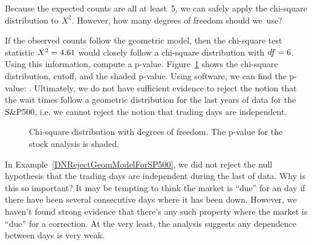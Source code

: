 \begin{exercisewrap}
\begin{nexercise}
Because the expected counts are all at least~5,
we can safely apply the chi-square distribution to $X^2$.
However, how many degrees of freedom should
we~use?\footnotemark{}
\end{nexercise}
\end{exercisewrap}

\begin{examplewrap}
\begin{nexample}{If the observed counts follow the
    geometric model, then the chi-square test statistic
    $X^2 = 4.61{}$ would closely follow a chi-square
    distribution with $df = 6{}$.
    Using this information, compute a p-value.} 
  \label{DNRejectGeomModelForSP500}%
  Figure~\ref{geomFitPValueForSP500} shows the
  chi-square distribution, cutoff, and the shaded p-value.
  Using software, we can find the p-value: \spdaysPvalue{}.
  Ultimately, we do not have sufficient evidence to reject
  the notion that the wait times follow a geometric
  distribution for the last \spyears{} years of data
  for the S\&P500,
  i.e. we cannot reject the notion that trading days
  are independent.
\end{nexample}
\end{examplewrap}

\begin{figure}[h]
  \centering
  \caption{Chi-square distribution with \spdaysDF{}
      degrees of freedom.
      The p-value for the stock analysis is shaded.}
  \label{geomFitPValueForSP500}
\end{figure}

\begin{examplewrap}
\begin{nexample}{In
    Example~\ref{DNRejectGeomModelForSP500},
    we did not reject the null hypothesis that the trading days
    are independent during the last \spyears{} of data.
    Why is this so important?}
  It may be tempting to think the market is ``due'' for
  an  day if there have been several consecutive
  days where it has been down.
  However, we haven't found strong evidence that there's
  any such property where the market is ``due'' for
  a correction.
  At the very least, the analysis suggests any dependence
  between days is very weak.
\end{nexample}
\end{examplewrap}

